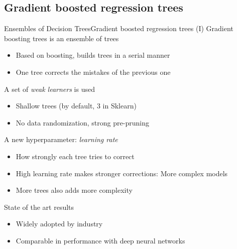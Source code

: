 \documentclass[10pt,compress]{beamer} %
\begin{document}
\subsection{Gradient boosted regression trees}
\begin{frame}{Ensembles of Decision Trees}{Gradient boosted regression trees (I)}
    \alert{Gradient boosting} trees is an ensemble of trees 
    \begin{itemize}
        \item Based on boosting, builds trees in a serial manner
        \item One tree corrects the mistakes of the previous one
    \end{itemize}

    A set of \textit{weak learners} is used
    \begin{itemize}
        \item Shallow trees (by default, $3$ in Sklearn)
        \item No data randomization, strong pre-pruning
    \end{itemize}

    A new hyperparameter: \textit{learning rate}
    \begin{itemize}
        \item How strongly each tree tries to correct
        \item High learning rate makes stronger corrections: More complex models
        \item More trees also adds more complexity
    \end{itemize}

    State of the art results
    \begin{itemize}
        \item Widely adopted by industry
        \item Comparable in performance with deep neural networks
    \end{itemize}
\end{frame}
\end{document}
